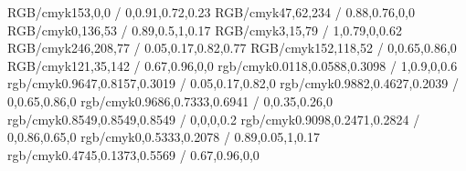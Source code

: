 \newcommand{\targetcolourmodel}{cmyk} %
\selectcolormodel{\targetcolourmodel}

\definecolor{dtured}    {RGB/cmyk}{153,0,0 / 0,0.91,0.72,0.23}
\definecolor{dtublue}      {RGB/cmyk}{47,62,234 / 0.88,0.76,0,0}
\definecolor{dtugreen}      {RGB/cmyk}{0,136,53 / 0.89,0.5,1,0.17}
\definecolor{dtunavy}      {RGB/cmyk}{3,15,79 / 1,0.79,0,0.62}
\definecolor{dtuyellow}      {RGB/cmyk}{246,208,77 / 0.05,0.17,0.82,0.77}
\definecolor{dtuorange}      {RGB/cmyk}{152,118,52 / 0,0.65,0.86,0}
\definecolor{dtupurple}      {RGB/cmyk}{121,35,142 / 0.67,0.96,0,0}
\definecolor{navyblue}  {rgb/cmyk}{0.0118,0.0588,0.3098 / 1,0.9,0,0.6}
\definecolor{yellow}    {rgb/cmyk}{0.9647,0.8157,0.3019 / 0.05,0.17,0.82,0}
\definecolor{orange}    {rgb/cmyk}{0.9882,0.4627,0.2039 / 0,0.65,0.86,0}
\definecolor{pink}      {rgb/cmyk}{0.9686,0.7333,0.6941 / 0,0.35,0.26,0}
\definecolor{grey}      {rgb/cmyk}{0.8549,0.8549,0.8549 / 0,0,0,0.2}
\definecolor{red}       {rgb/cmyk}{0.9098,0.2471,0.2824 / 0,0.86,0.65,0}
\definecolor{green}     {rgb/cmyk}{0,0.5333,0.2078 / 0.89,0.05,1,0.17}
\definecolor{purple}    {rgb/cmyk}{0.4745,0.1373,0.5569 / 0.67,0.96,0,0}

\newcommand{\dtulogocolour}{white} %
\newcommand{\frontpagetextcolour}{white} %


\renewcommand\RSlargest{75pt}


